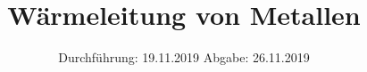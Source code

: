 

\subject{Versuch 204}
\title{Wärmeleitung von Metallen}
\date{
  Durchführung: 19.11.2019
  \hspace{3em}
  Abgabe: 26.11.2019
}



\maketitle
\thispagestyle{empty}
\tableofcontents
\newpage








\printbibliography{}


